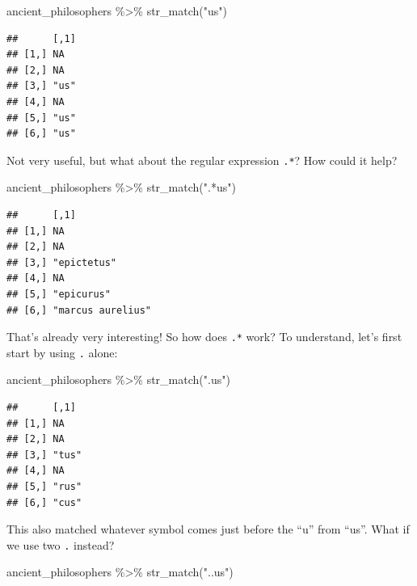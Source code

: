 \documentclass[
]{article}
\newenvironment{Shaded}{\begin{snugshade}}{\end{snugshade}}
\newcommand{\FunctionTok}[1]{\textcolor[rgb]{0.00,0.00,0.00}{#1}}
\newcommand{\NormalTok}[1]{#1}
\newcommand{\SpecialCharTok}[1]{\textcolor[rgb]{0.00,0.00,0.00}{#1}}
\newcommand{\StringTok}[1]{\textcolor[rgb]{0.31,0.60,0.02}{#1}}
\begin{document}
\begin{Shaded}
\begin{Highlighting}[]
\NormalTok{ancient\_philosophers }\SpecialCharTok{\%\textgreater{}\%}
  \FunctionTok{str\_match}\NormalTok{(}\StringTok{"us"}\NormalTok{)}
\end{Highlighting}
\end{Shaded}

\begin{verbatim}
##      [,1]
## [1,] NA  
## [2,] NA  
## [3,] "us"
## [4,] NA  
## [5,] "us"
## [6,] "us"
\end{verbatim}

Not very useful, but what about the regular expression \texttt{.*}? How could it help?

\begin{Shaded}
\begin{Highlighting}[]
\NormalTok{ancient\_philosophers }\SpecialCharTok{\%\textgreater{}\%}
  \FunctionTok{str\_match}\NormalTok{(}\StringTok{".*us"}\NormalTok{)}
\end{Highlighting}
\end{Shaded}

\begin{verbatim}
##      [,1]             
## [1,] NA               
## [2,] NA               
## [3,] "epictetus"      
## [4,] NA               
## [5,] "epicurus"       
## [6,] "marcus aurelius"
\end{verbatim}

That's already very interesting! So how does \texttt{.*} work? To understand, let's first start by using
\texttt{.} alone:

\begin{Shaded}
\begin{Highlighting}[]
\NormalTok{ancient\_philosophers }\SpecialCharTok{\%\textgreater{}\%}
  \FunctionTok{str\_match}\NormalTok{(}\StringTok{".us"}\NormalTok{)}
\end{Highlighting}
\end{Shaded}

\begin{verbatim}
##      [,1] 
## [1,] NA   
## [2,] NA   
## [3,] "tus"
## [4,] NA   
## [5,] "rus"
## [6,] "cus"
\end{verbatim}

This also matched whatever symbol comes just before the ``u'' from ``us''. What if we use two \texttt{.} instead?

\begin{Shaded}
\begin{Highlighting}[]
\NormalTok{ancient\_philosophers }\SpecialCharTok{\%\textgreater{}\%}
  \FunctionTok{str\_match}\NormalTok{(}\StringTok{"..us"}\NormalTok{)}
\end{Highlighting}
\end{Shaded}
\end{document}
